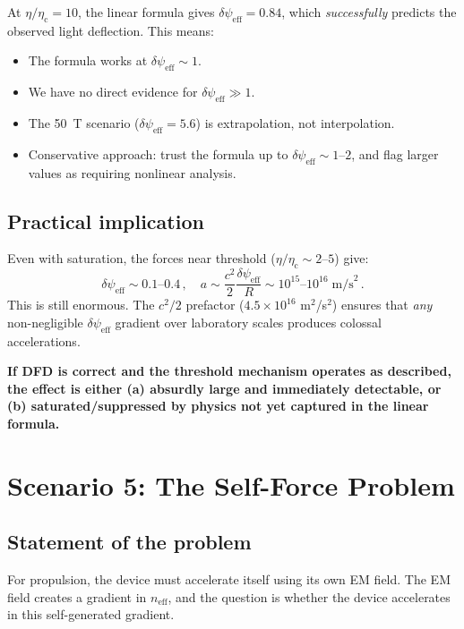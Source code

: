 \documentclass[12pt,a4paper]{article}
\newcommand{\psieff}{\psi_{\mathrm{eff}}}
\newcommand{\neff}{n_{\mathrm{eff}}}
\newcommand{\etac}{\eta_{\mathrm{c}}}
\begin{document}
At $\eta/\etac = 10$, the linear formula gives $\delta\psieff = 0.84$, which \emph{successfully}
predicts the observed light deflection. This means:
\begin{itemize}
\item The formula works at $\delta\psieff \sim 1$.
\item We have no direct evidence for $\delta\psieff \gg 1$.
\item The 50~T scenario ($\delta\psieff = 5.6$) is extrapolation, not interpolation.
\item Conservative approach: trust the formula up to $\delta\psieff \sim 1$--$2$, and flag
      larger values as requiring nonlinear analysis.
\end{itemize}

\subsection{Practical implication}

Even with saturation, the forces near threshold ($\eta/\etac \sim 2$--$5$) give:
\begin{equation}
\delta\psieff \sim 0.1\text{--}0.4\,,\quad a \sim \frac{c^2}{2}\frac{\delta\psieff}{R}
\sim 10^{15}\text{--}10^{16}\;\text{m/s}^2\,.
\end{equation}
This is still enormous. The $c^2/2$ prefactor ($4.5 \times 10^{16}$ m$^2$/s$^2$) ensures that
\emph{any} non-negligible $\delta\psieff$ gradient over laboratory scales produces colossal accelerations.

\textbf{If DFD is correct and the threshold mechanism operates as described, the effect is either
(a) absurdly large and immediately detectable, or (b) saturated/suppressed by physics not yet
captured in the linear formula.}

\section{Scenario 5: The Self-Force Problem}
\label{sec:selfforce}

\subsection{Statement of the problem}

For propulsion, the device must accelerate itself using its own EM field. The EM field creates a
gradient in $\neff$, and the question is whether the device accelerates in this self-generated gradient.
\end{document}
